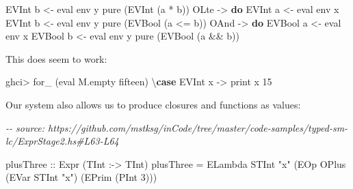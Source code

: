\documentclass[]{article}
\newenvironment{Shaded}{}{}
\newcommand{\CommentTok}[1]{\textcolor[rgb]{0.38,0.63,0.69}{\textit{#1}}}
\newcommand{\DataTypeTok}[1]{\textcolor[rgb]{0.56,0.13,0.00}{#1}}
\newcommand{\DecValTok}[1]{\textcolor[rgb]{0.25,0.63,0.44}{#1}}
\newcommand{\FunctionTok}[1]{\textcolor[rgb]{0.02,0.16,0.49}{#1}}
\newcommand{\KeywordTok}[1]{\textcolor[rgb]{0.00,0.44,0.13}{\textbf{#1}}}
\newcommand{\NormalTok}[1]{#1}
\newcommand{\OperatorTok}[1]{\textcolor[rgb]{0.40,0.40,0.40}{#1}}
\newcommand{\OtherTok}[1]{\textcolor[rgb]{0.00,0.44,0.13}{#1}}
\newcommand{\StringTok}[1]{\textcolor[rgb]{0.25,0.44,0.63}{#1}}
\begin{document}
\begin{Shaded}
\begin{Highlighting}[]
      \DataTypeTok{EVInt}\NormalTok{ b }\OtherTok{\textless{}{-}}\NormalTok{ eval env y}
      \FunctionTok{pure}\NormalTok{ (}\DataTypeTok{EVInt}\NormalTok{ (a }\OperatorTok{*}\NormalTok{ b))}
    \DataTypeTok{OLte} \OtherTok{{-}\textgreater{}} \KeywordTok{do}
      \DataTypeTok{EVInt}\NormalTok{ a }\OtherTok{\textless{}{-}}\NormalTok{ eval env x}
      \DataTypeTok{EVInt}\NormalTok{ b }\OtherTok{\textless{}{-}}\NormalTok{ eval env y}
      \FunctionTok{pure}\NormalTok{ (}\DataTypeTok{EVBool}\NormalTok{ (a }\OperatorTok{\textless{}=}\NormalTok{ b))}
    \DataTypeTok{OAnd} \OtherTok{{-}\textgreater{}} \KeywordTok{do}
      \DataTypeTok{EVBool}\NormalTok{ a }\OtherTok{\textless{}{-}}\NormalTok{ eval env x}
      \DataTypeTok{EVBool}\NormalTok{ b }\OtherTok{\textless{}{-}}\NormalTok{ eval env y}
      \FunctionTok{pure}\NormalTok{ (}\DataTypeTok{EVBool}\NormalTok{ (a }\OperatorTok{\&\&}\NormalTok{ b))}
\end{Highlighting}
\end{Shaded}

This does seem to work:

\begin{Shaded}
\begin{Highlighting}[]
\NormalTok{ghci}\OperatorTok{\textgreater{}}\NormalTok{ for\_ (eval M.empty fifteen) \textbackslash{}}\KeywordTok{case}
    \DataTypeTok{EVInt}\NormalTok{ x }\OtherTok{{-}\textgreater{}} \FunctionTok{print}\NormalTok{ x}
\DecValTok{15}
\end{Highlighting}
\end{Shaded}

Our system also allows us to produce closures and functions as values:

\begin{Shaded}
\begin{Highlighting}[]
\CommentTok{{-}{-} source: https://github.com/mstksg/inCode/tree/master/code{-}samples/typed{-}sm{-}lc/ExprStage2.hs\#L63{-}L64}

\OtherTok{plusThree ::} \DataTypeTok{Expr}\NormalTok{ (}\DataTypeTok{TInt} \OperatorTok{:{-}\textgreater{}} \DataTypeTok{TInt}\NormalTok{)}
\NormalTok{plusThree }\OtherTok{=} \DataTypeTok{ELambda} \DataTypeTok{STInt} \StringTok{"x"}\NormalTok{ (}\DataTypeTok{EOp} \DataTypeTok{OPlus}\NormalTok{ (}\DataTypeTok{EVar} \DataTypeTok{STInt} \StringTok{"x"}\NormalTok{) (}\DataTypeTok{EPrim}\NormalTok{ (}\DataTypeTok{PInt} \DecValTok{3}\NormalTok{)))}
\end{Highlighting}
\end{Shaded}
\end{document}
